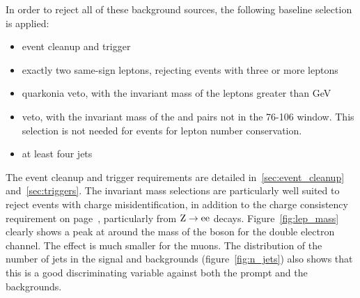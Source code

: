 In order to reject all of these background sources, the following baseline
selection is applied:
\begin{itemize}
    \item event cleanup and trigger
    \item exactly two same-sign leptons, rejecting events with three or more
        leptons
    \item quarkonia veto, with the invariant mass of the leptons greater
        than \unit[20]{GeV}
    \item \Z veto, with the invariant mass of the \E\E and \M\M pairs not in
        the 76-106 window. This selection is not needed for \E\M
        events for lepton number conservation.
    \item at least four jets
\end{itemize}
The event cleanup and trigger requirements are detailed
in~\ref{sec:event_cleanup} and~\ref{sec:triggers}.
The invariant mass selections are particularly well suited to 
reject events with charge misidentification, in addition to the charge
consistency requirement on page~\pageref{page:electron_charge}, particularly from $\mathrm{Z}
\rightarrow \mathrm{e}\mathrm{e}$ decays. Figure~\ref{fig:lep_mass} clearly shows a peak at
around the mass of the \Z boson for the double electron channel. The effect
is much smaller for the muons. 
The distribution of the number of jets in the signal and backgrounds
(figure~\ref{fig:n_jets}) also
shows that this is a good discriminating variable against both the
prompt and the \ttbar backgrounds.

